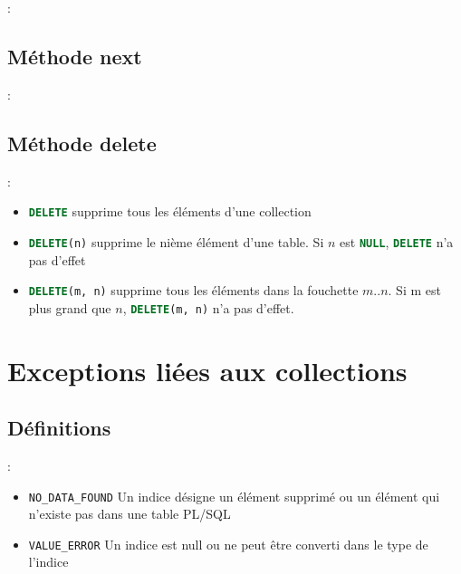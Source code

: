 \documentclass[10pt]{beamer}
\begin{document}
\begin{frame}{\secname : \subsecname}
    
\end{frame}

\subsection{Méthode next}
\begin{frame}{\secname : \subsecname}
    
\end{frame}

\subsection{Méthode delete}
\begin{frame}{\secname : \subsecname}
    \begin{itemize}
        \item \lstinline[language=sql]!DELETE! supprime tous les éléments d'une collection
        \item \lstinline[language=sql]!DELETE(n)! supprime le nième élément d'une table.  Si $n$ est \lstinline[language=sql]!NULL!, \lstinline[language=sql]!DELETE! n'a pas d'effet
        \item \lstinline[language=sql]!DELETE(m, n)! supprime tous les éléments dans la fouchette $m..n$.  Si m est plus grand que $n$, \lstinline[language=sql]!DELETE(m, n)! n'a pas d'effet.
    \end{itemize}
\end{frame}

\section{Exceptions liées aux collections}
\tocss
\subsection{Définitions}
\begin{frame}{\secname : \subsecname}
    \begin{itemize}
        \item \lstinline[language=sql]!NO_DATA_FOUND! Un indice désigne un élément supprimé ou un élément qui n'existe pas dans une table PL/SQL
        \item \lstinline[language=sql]!VALUE_ERROR! Un indice est null ou ne peut être converti dans le type de l'indice
    \end{itemize}
\end{frame}
\end{document}
